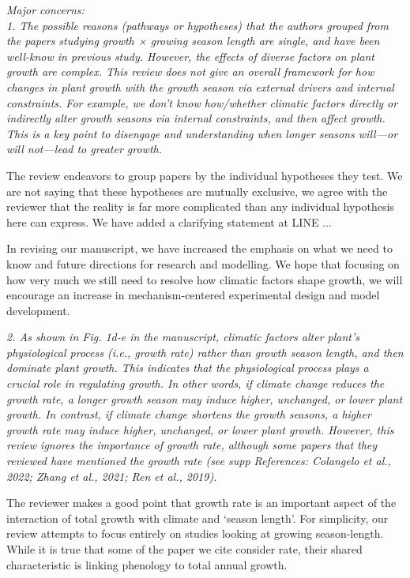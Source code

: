 \documentclass[11pt]{article}
\begin{document}
\emph{Major concerns:}\\
\emph{1. The possible reasons (pathways or hypotheses) that the authors grouped from the papers studying growth × growing season length are single, and have been well-know in previous study. However, the effects of diverse factors on plant growth are complex. This review does not give an overall framework for how changes in plant growth with the growth season via external drivers and internal constraints. For example, we don’t know how/whether climatic factors directly or indirectly alter growth seasons via internal constraints, and then affect growth. This is a key point to disengage and understanding when longer seasons will—or will not—lead to greater growth.}

The review endeavors to group papers by the individual hypotheses they test. We are not saying that these hypotheses are mutually exclusive, we agree with the reviewer that the reality is far more complicated than any individual hypothesis here can express. We have added a clarifying statement at LINE  ... %

 In revising our manuscript, we have increased the emphasis on what we need to know and future directions for research and modelling. We hope that focusing on how very much we still need to resolve how climatic factors shape growth, we will encourage an increase in mechanism-centered experimental design and model development.


\emph{2. As shown in Fig. 1d-e in the manuscript, climatic factors alter plant’s physiological process (i.e., growth rate) rather than growth season length, and then dominate plant growth. This indicates that the physiological process plays a crucial role in regulating growth. In other words, if climate change reduces the growth rate, a longer growth season may induce higher, unchanged, or lower plant growth. In contrast, if climate change shortens the growth seasons, a higher growth rate may induce higher, unchanged, or lower plant growth. However, this review ignores the importance of growth rate, although some papers that they reviewed have mentioned the growth rate (see supp References: Colangelo et al., 2022; Zhang et al., 2021; Ren et al., 2019).}


The reviewer makes a good point that growth rate is an important aspect of the interaction of total growth with climate and ‘season length’. For simplicity, our review attempts to focus entirely on studies looking at growing season-length. While it is true that some of the paper we cite consider rate, their shared characteristic is linking phenology to total annual growth. 
\end{document}
